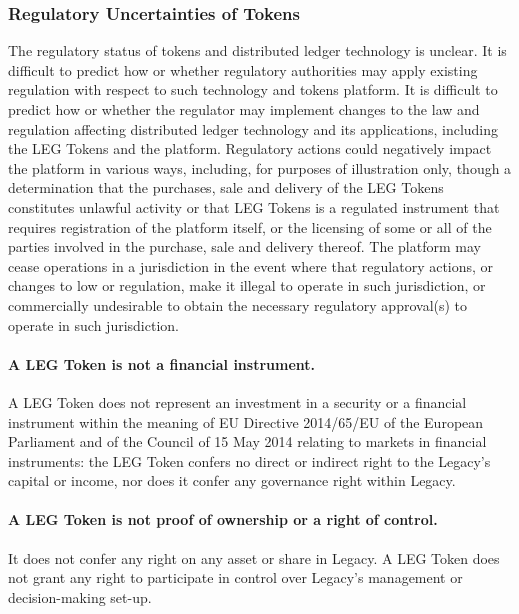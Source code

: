 \subsubsection*{Regulatory Uncertainties of Tokens} %
\label{ssub:regulatory_uncertainties_of_tokens}
The regulatory status of tokens and distributed ledger technology is unclear. It is difficult to predict how or whether regulatory authorities may apply existing regulation with respect to such technology and tokens platform. It is difficult to predict how or whether the regulator may implement changes to the law and regulation affecting distributed ledger technology and its applications, including the LEG Tokens and the platform. Regulatory actions could negatively impact the platform in various ways, including, for purposes of illustration only, though a determination that the purchases, sale and delivery of the LEG Tokens constitutes unlawful activity or that LEG Tokens is a regulated instrument that requires registration of the platform itself, or the licensing of some or all of the parties involved in the purchase, sale and delivery thereof. The platform may cease operations in a jurisdiction in the event where that regulatory actions, or changes to low or regulation, make it illegal to operate in such jurisdiction, or commercially undesirable to obtain the necessary regulatory approval(s) to operate in such jurisdiction.


\paragraph{A LEG Token  is not a financial instrument.} A LEG Token does not represent an investment in a security or a financial instrument within the meaning of EU Directive 2014/65/EU of the European Parliament and of the Council of 15 May 2014 relating to markets in financial instruments: the LEG Token confers no direct or indirect right to the Legacy's capital or income, nor does it confer any governance right within Legacy.


\paragraph{A LEG Token is not proof of ownership or a right of control.} It does not confer any right on any asset or share in Legacy. A LEG Token does not grant any right to participate in control over Legacy's management or decision-making set-up.

